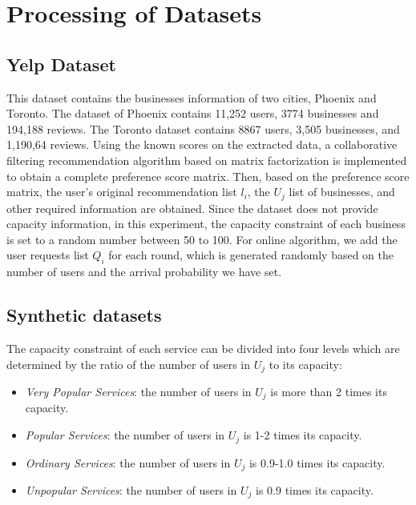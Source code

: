 \section{Processing of Datasets}
\subsection{Yelp Dataset}
This dataset contains the businesses information of two cities, Phoenix and Toronto. The dataset of Phoenix contains 11,252 users, 3774 businesses and 194,188 reviews. The Toronto dataset contains 8867 users, 3,505 businesses, and 1,190,64 reviews. Using the known scores on the extracted data, a collaborative filtering recommendation algorithm based on matrix factorization is implemented to obtain a complete preference score matrix. Then, based on the preference score matrix, the user’s original recommendation list $l_i$, the $U_j$ list of businesses, and other required information are obtained. Since the dataset does not provide capacity information, in this experiment, the capacity constraint of each business is set to a random number between 50 to 100. For online algorithm, we add the user requests list $Q_i$ for each round, which is generated randomly based on the number of users and the arrival probability we have set. 

\subsection{Synthetic datasets}
The capacity constraint of each service can be divided into four levels which are determined by the ratio of the number of users in $U_j$ to its capacity:
\begin{itemize}
    \item \emph{Very Popular Services}: the number of users in $U_j$ is more than 2 times its capacity.
    \item \emph{Popular Services}: the number of users in $U_j$ is 1-2 times its capacity.
    \item \emph{Ordinary Services}: the number of users in $U_j$ is 0.9-1.0 times its capacity.
    \item \emph{Unpopular Services}: the number of users in $U_j$ is 0.9 times its capacity.
\end{itemize}

